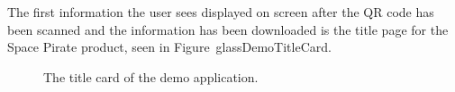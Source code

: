 The first information the user sees displayed on screen after the QR code has been scanned and the information has been downloaded is the title page for the Space Pirate product, seen in Figure~{glassDemoTitleCard}.

	
		\begin{figure}[ht!]
		\centering
   		 \qquad
   		 \qquad
		\caption{The title card of the demo application.}
		\label{glassDemoTitleCard}
	\end{figure}
	
